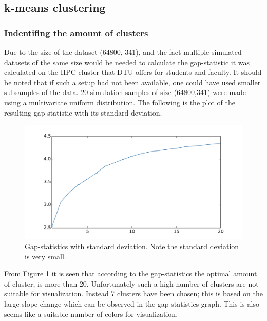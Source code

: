\subsection{k-means clustering}
\label{section:result-kmeans}

\subsubsection{Indentifing the amount of clusters}
Due to the size of the dataset (64800, 341), and the fact multiple simulated datasets of the same size would be needed to calculate the gap-statistic it was calculated on the HPC cluster that DTU offers for students and faculty.
It should be noted that if such a setup had not been available, one could have used smaller subsamples of the data.
20 simulation samples of size (64800,341) were made using a multivariate uniform distribution. The following is the plot of the resulting gap statistic with its standard deviation.
\begin{figure}[H]
	\center
	\includegraphics[width=\textwidth]{figures/kmeans-gap}
	\caption{Gap-statistics with standard deviation. Note the standard deviation is very small.}
	\label{fig:kmeans-gap}
\end{figure}

From Figure \ref{fig:kmeans-gap} it is seen that according to the gap-statistics the optimal amount of cluster, is more than 20. Unfortunately such a high number of clusters are not suitable for visualization. Instead 7 clusters have been chosen; this is based on the large slope change which can be observed in the gap-statistics graph. This is also seems like a suitable number of colors for visualization.

